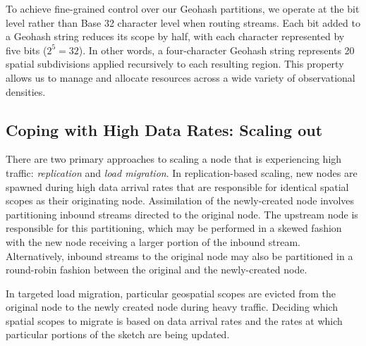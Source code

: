 To achieve fine-grained control over our Geohash partitions, we operate at the bit level rather than Base 32 character level when routing streams. Each bit added to a Geohash string reduces its scope by half, with each character represented by five bits ($2^5 = 32$). In other words, a four-character Geohash string represents 20 spatial subdivisions applied recursively to each resulting region. This property allows us to manage and allocate resources across a wide variety of observational densities.









\subsection{Coping with High Data Rates: Scaling out}
\label{subsec:scaling-out}
%
There are two primary approaches to scaling a node that is experiencing high traffic: \emph{replication} and \emph{load migration}. In replication-based scaling, new nodes are spawned during high data arrival rates that are responsible for identical spatial scopes as their originating node. Assimilation of the newly-created node involves partitioning inbound streams directed to the original node. The upstream node is responsible for this partitioning, which may be performed in a skewed fashion with the new node receiving a larger portion of the inbound stream.  Alternatively, inbound streams to the original node may also be partitioned in a round-robin fashion between the original and the newly-created node.

In targeted load migration, particular geospatial scopes are evicted from the original node to the newly created node during heavy traffic. Deciding which spatial scopes to migrate is based on data arrival rates and the rates at which particular portions of the sketch are being updated.

